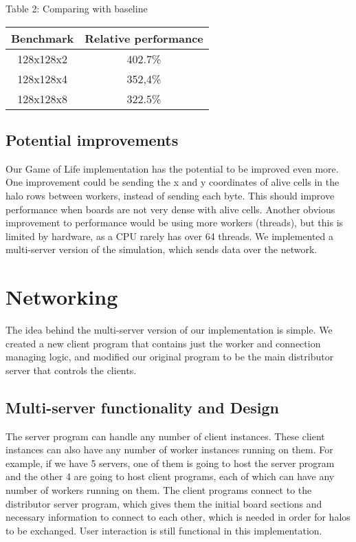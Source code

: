 \documentclass[a4, 11pt]{article}
\begin{document}
\begin{multicols}{2}
\begin{center}Table 2: Comparing with baseline\end{center} 
\vspace{0.2cm}
\begin{center}
\begin{tabular}{c|c}
\hline
Benchmark & Relative performance  \\
\hline
128x128x2 & 402.7\% \\
128x128x4 & 352,4\% \\
128x128x8 & 322.5\% \\
\hline
\end{tabular}
\end{center}
\vspace{0.4cm}

\subsection{Potential improvements}

Our Game of Life implementation has the potential to be improved even more. One improvement could be sending the x and y coordinates of alive cells in the halo rows between workers, instead of sending each byte. This should improve performance when boards are not very dense with alive cells. Another obvious improvement to performance would be using more workers (threads), but this is limited by hardware, as a CPU rarely has over 64 threads. We implemented a multi-server version of the simulation, which sends data over the network.

\section{Networking}

The idea behind the multi-server version of our implementation is simple. We created a new client program that contains just the worker and connection managing logic, and modified our original program to be the main distributor server that controls the clients.

\subsection{Multi-server functionality and Design}
The server program can handle any number of client instances. These client instances can also have any number of worker instances running on them. For example, if we have 5 servers, one of them is going to host the server program and the other 4 are going to host client programs, each of which can have any number of workers running on them. The client programs connect to the distributor server program, which gives them the initial board sections and necessary information to connect to each other, which is needed in order for halos to be exchanged. User interaction is still functional in this implementation.


\end{multicols}
\end{document}
